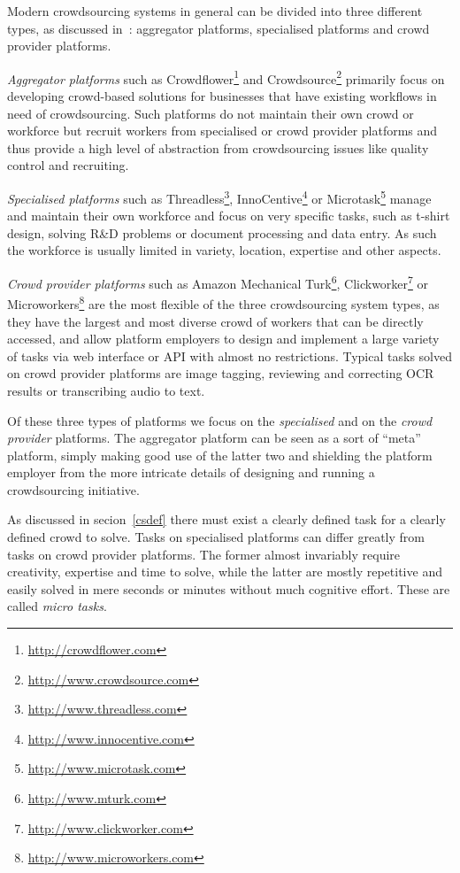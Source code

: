 \documentclass{sig-alternate}
\begin{document}
Modern crowdsourcing systems in general can be divided into three different
types, as discussed in~\cite{hossfeld2013crowdtesting}: aggregator platforms,
specialised platforms and crowd provider platforms. 

\emph{Aggregator platforms} such as
Crowdflower\footnote{\url{http://crowdflower.com}} and
Crowdsource\footnote{\url{http://www.crowdsource.com}} primarily focus on
developing crowd-based solutions for businesses that have existing workflows in
need of crowdsourcing. Such platforms do not maintain their own crowd or
workforce but recruit workers from specialised or crowd provider platforms and
thus provide a high level of abstraction from crowdsourcing issues like quality
control and recruiting. 

\emph{Specialised platforms} such as
Threadless\footnote{\url{http://www.threadless.com}},
InnoCentive\footnote{\url{http://www.innocentive.com}} or
Microtask\footnote{\url{http://www.microtask.com}} manage and maintain their
own workforce and focus on very specific tasks, such as t-shirt design, solving
R\&D problems or document processing and data entry. As such the workforce is
usually limited in variety, location, expertise and other aspects.

\emph{Crowd provider platforms} such as Amazon Mechanical
Turk\footnote{\url{http://www.mturk.com}},
Clickworker\footnote{\url{http://www.clickworker.com}} or
Microworkers\footnote{\url{http://www.microworkers.com}} are the most flexible
of the three crowdsourcing system types, as they have the largest and most diverse
crowd of workers that can be directly accessed, and allow platform employers to
design and implement a large variety of tasks via web interface or API with
almost no restrictions. Typical tasks solved on crowd provider platforms are
image tagging, reviewing and correcting OCR results or transcribing audio to
text.

Of these three types of platforms we focus on the \emph{specialised} and on the
\emph{crowd provider} platforms. The aggregator platform can be seen as a
sort of ``meta'' platform, simply making good use of the latter two and
shielding the platform employer from the more intricate details of designing
and running a crowdsourcing initiative.

As discussed in secion~\ref{csdef} there must exist a clearly defined task for
a clearly defined crowd to solve. Tasks on specialised platforms can differ
greatly from tasks on crowd provider platforms. The former almost invariably
require creativity, expertise and time to solve, while the latter are mostly
repetitive and easily solved in mere seconds or minutes without much cognitive
effort.  These are called \emph{micro tasks}.
\end{document}
